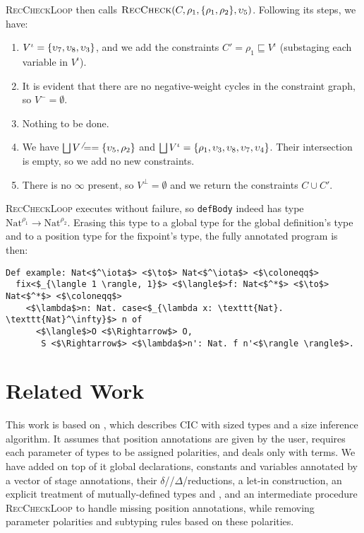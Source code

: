 \documentclass[acmsmall,nonacm,screen,review,anonymous,10pt]{acmart}
\begin{document}
\textsc{RecCheckLoop} then calls $\textsc{RecCheck}(C, \rho_1, \{\rho_1, \rho_2\}, \upsilon_5)$. Following its steps, we have:
\begin{enumerate}
    \item $V^\iota = \{\upsilon_7, \upsilon_8, \upsilon_3\}$, and we add the constraints $C' = \rho_1 \sqsubseteq V^\iota$ (substaging each variable in $V^\iota$).
    \item It is evident that there are no negative-weight cycles in the constraint graph, so $V^- = \emptyset$.
    \item Nothing to be done.
    \item We have $\bigsqcup V^\neq = \{\upsilon_5, \rho_2\}$ and $\bigsqcup V^\iota = \{\rho_1, \upsilon_3, \upsilon_8, \upsilon_7, \upsilon_4\}$. Their intersection is empty, so we add no new constraints.
    \item There is no $\infty$ present, so $V^\bot = \emptyset$ and we return the constraints $C \cup C'$.
\end{enumerate}

\textsc{RecCheckLoop} executes without failure, so \texttt{defBody} indeed has type $\text{Nat}^{\rho_1} \to \text{Nat}^{\rho_2}$. Erasing this type to a global type for the global definition's type and to a position type for the fixpoint's type, the fully annotated program is then:

\begin{verbatim}
Def example: Nat<$^\iota$> <$\to$> Nat<$^\iota$> <$\coloneqq$>
  fix<$_{\langle 1 \rangle, 1}$> <$\langle$>f: Nat<$^*$> <$\to$> Nat<$^*$> <$\coloneqq$>
    <$\lambda$>n: Nat. case<$_{\lambda x: \texttt{Nat}. \texttt{Nat}^\infty}$> n of
      <$\langle$>O <$\Rightarrow$> O,
       S <$\Rightarrow$> <$\lambda$>n': Nat. f n'<$\rangle \rangle$>.
\end{verbatim}

\section{Related Work}\label{sec:related}

This work is based on \CIChat \cite{cic-hat}, which describes CIC with sized types and a size inference algorithm. It assumes that position annotations are given by the user, requires each parameter of \coinductive types to be assigned polarities, and deals only with terms. We have added on top of it global declarations, constants and variables annotated by a vector of stage annotations, their $\delta$\-//$\Delta$\-/reductions, a let-in construction, an explicit treatment of mutually-defined \coinductive types and \cofixpoints, and an intermediate procedure \textsc{RecCheckLoop} to handle missing position annotations, while removing parameter polarities and subtyping rules based on these polarities.
\end{document}
